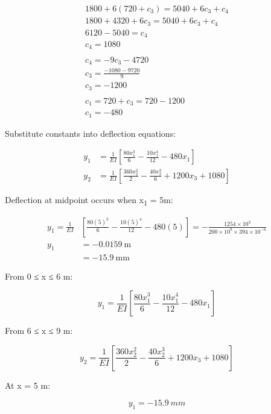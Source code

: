 \documentclass[
  letterpaper,
  DIV=11,
  numbers=noendperiod]{scrreprt}
\begin{document}
\begin{tcolorbox}
\begin{tcolorbox}
\[
\begin{gathered}
1800+6\left(720+c_3\right)=5040+6 c_3+c_4 \\
1800+4320+6 c_3=5040+6 c_3+c_4 \\
6120-5040=c_4 \\
c_4=1080 \\\\
c_4=-9 c_3-4720 \\
c_3=\frac{-1080-9720}{9} \\
c_3=-1200 \\\\
c_1=720+c_3=720-1200 \\
c_1=-480
\end{gathered}
\]

Substitute constants into deflection equations:

\[
\begin{aligned}y_1 & =\frac{1}{E I}\left[\frac{80 x_1^3}{6}-\frac{10 x_1^4}{12}-480 x_1\right] \\y_2 & =\frac{1}{E I}\left[\frac{360 x_2^2}{2}-\frac{40 x_2^3}{6}+1200 x_3+1080\right]\end{aligned}
\]

Deflection at midpoint occurs when x\textsubscript{1} = 5m:

\[
\begin{aligned}y_1=\frac{1}{EI} & {\left[\frac{80(5)^3}{6}-\frac{10(5)^4}{12}-480(5)\right]=-\frac{1254 \times 10^3}{200 \times 10^9 \times 394 \times 10^{-6}} } \\y_1 & =-0.0159 \mathrm{~m} \\& =-15.9 \mathrm{~mm}\end{aligned}
\]

\end{tcolorbox}

\begin{tcolorbox}[enhanced jigsaw, colback=white, colframe=quarto-callout-note-color-frame, leftrule=.75mm, opacitybacktitle=0.6, colbacktitle=quarto-callout-note-color!10!white, arc=.35mm, bottomrule=.15mm, breakable, title={Answer only}, left=2mm, titlerule=0mm, toptitle=1mm, toprule=.15mm, opacityback=0, rightrule=.15mm, coltitle=black, bottomtitle=1mm]

From 0 ≤ x ≤ 6 m:

\[
y_1=\frac{1}{E I}\left[\frac{80 x_1^3}{6}-\frac{10 x_1^4}{12}-480 x_1\right]
\]

From 6 ≤ x ≤ 9 m:

\[
y_2=\frac{1}{E I}\left[\frac{360 x_2^2}{2}-\frac{40 x_2^3}{6}+1200 x_3+1080\right]
\]

At x = 5 m:

\[
y_1=-15.9~mm
\]

\end{tcolorbox}

\end{tcolorbox}
\end{document}
